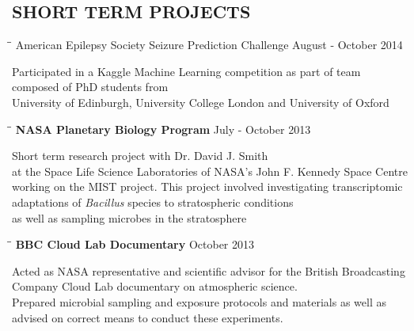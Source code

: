 \documentclass{res}
\begin{document}
\begin{resume}
\section{SHORT TERM PROJECTS}

   \vspace{-0.05in} 

   \begin{tabbing}
   \hspace{2in}\= \hspace{2.6in}\= \kill 
    {\bf } American Epilepsy Society Seizure Prediction Challenge \> \>        August - October 2014\\
     \end{tabbing}\vspace{-20pt}      
     Participated in a Kaggle Machine Learning competition as part of team composed of PhD students from \\
     University of Edinburgh, University College London and University of Oxford\\

   \vspace{-0.05in} 


   \begin{tabbing}
   \hspace{2in}\= \hspace{2.6in}\= \kill 
    {\bf NASA Planetary Biology Program} \> \>        July - October 2013\\
     \end{tabbing}\vspace{-20pt}      
     Short term research project with Dr. David J. Smith \\  at the Space Life Science Laboratories of NASA's John F. Kennedy Space Centre \\ working on the MIST project. This project involved investigating transcriptomic adaptations of \textit{Bacillus} species to stratospheric conditions \\ as well as sampling microbes in the stratosphere

     \vspace{-0.1in}
   \begin{tabbing}
   \hspace{2in}\= \hspace{2.6in}\= \kill 
    {\bf BBC Cloud Lab Documentary} \> \>        October 2013\\
     \end{tabbing}\vspace{-20pt}      
     Acted as NASA representative and scientific advisor for the British Broadcasting Company Cloud Lab documentary on atmospheric science.\\  Prepared microbial sampling and exposure protocols and materials as well as advised on correct means to conduct these experiments.


\end{resume}
\end{document}
